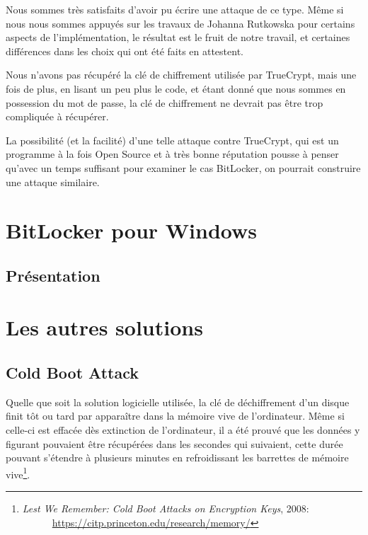\documentclass[12pt,a4paper]{article}
\begin{document}
Nous sommes très satisfaits d'avoir pu écrire une attaque de ce type. Même si
nous nous sommes appuyés sur les travaux de Johanna Rutkowska pour certains
aspects de l'implémentation, le résultat est le fruit de notre travail, et
certaines différences dans les choix qui ont été faits en attestent.

Nous n'avons pas récupéré la clé de chiffrement utilisée par TrueCrypt, mais une
fois de plus, en lisant un peu plus le code, et étant donné que nous sommes en 
possession du mot de passe, la clé de chiffrement ne devrait pas être trop 
compliquée à récupérer.

La possibilité (et la facilité) d'une telle attaque contre TrueCrypt, qui est un
programme à la fois Open Source et à très bonne réputation pousse à penser qu'avec
un temps suffisant pour examiner le cas BitLocker, on pourrait construire une
attaque similaire.


\section{BitLocker pour Windows}

\subsection{Présentation}



\section{Les autres solutions}

\subsection{Cold Boot Attack}

Quelle que soit la solution logicielle utilisée, la clé de déchiffrement d'un disque finit tôt ou tard par apparaître dans la mémoire vive de l'ordinateur. Même si celle-ci est effacée dès extinction de l'ordinateur, il a été prouvé que les données y figurant pouvaient être récupérées dans les secondes qui suivaient, cette durée pouvant s'étendre à plusieurs minutes en refroidissant les barrettes de mémoire vive\footnote{\textit{Lest We Remember: Cold Boot Attacks on Encryption Keys}, 2008:\\
~~~~~~\url{https://citp.princeton.edu/research/memory/}}.
\end{document}

